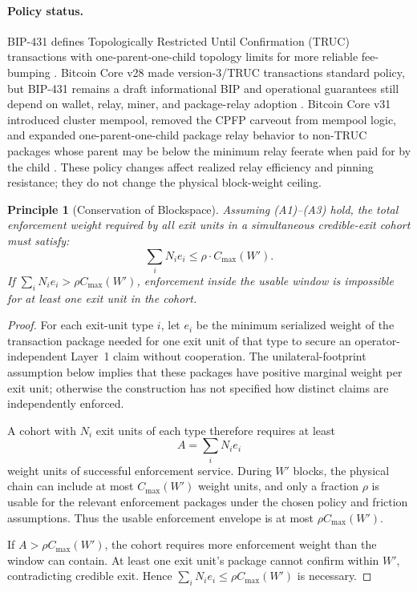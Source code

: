\documentclass{article}
\newtheorem{principle}{Principle}
\theoremstyle{definition}
\begin{document}
\paragraph{Policy status.}
BIP-431 defines Topologically Restricted Until Confirmation (TRUC) transactions with one-parent-one-child topology limits for more reliable fee-bumping \cite{bip431}. Bitcoin Core v28 made version-3/TRUC transactions standard policy, but BIP-431 remains a draft informational BIP and operational guarantees still depend on wallet, relay, miner, and package-relay adoption \cite{core28,packagepolicy}. Bitcoin Core v31 introduced cluster mempool, removed the CPFP carveout from mempool logic, and expanded one-parent-one-child package relay behavior to non-TRUC packages whose parent may be below the minimum relay feerate when paid for by the child \cite{core31}. These policy changes affect realized relay efficiency and pinning resistance; they do not change the physical block-weight ceiling.

\begin{principle}[Conservation of Blockspace]
Assuming (A1)--(A3) hold, the total enforcement weight required by all exit units in a simultaneous credible-exit cohort must satisfy:
\small
\begin{equation*}
\sum_i N_i e_i \le \rho \cdot C_{\max}(W').
\end{equation*}
\normalsize
If $\sum_i N_i e_i > \rho C_{\max}(W')$, enforcement inside the usable window is impossible for at least one exit unit in the cohort.
\end{principle}

\begin{proof}
For each exit-unit type $i$, let $e_i$ be the minimum serialized weight of the transaction package needed for one exit unit of that type to secure an operator-independent Layer~1 claim without cooperation. The unilateral-footprint assumption below implies that these packages have positive marginal weight per exit unit; otherwise the construction has not specified how distinct claims are independently enforced.

A cohort with $N_i$ exit units of each type therefore requires at least
\small
\begin{equation*}
A = \sum_i N_i e_i
\end{equation*}
\normalsize
weight units of successful enforcement service. During $W'$ blocks, the physical chain can include at most $C_{\max}(W')$ weight units, and only a fraction $\rho$ is usable for the relevant enforcement packages under the chosen policy and friction assumptions. Thus the usable enforcement envelope is at most $\rho C_{\max}(W')$.

If $A > \rho C_{\max}(W')$, the cohort requires more enforcement weight than the window can contain. At least one exit unit's package cannot confirm within $W'$, contradicting credible exit. Hence $\sum_i N_i e_i \le \rho C_{\max}(W')$ is necessary.
\end{proof}
\end{document}
